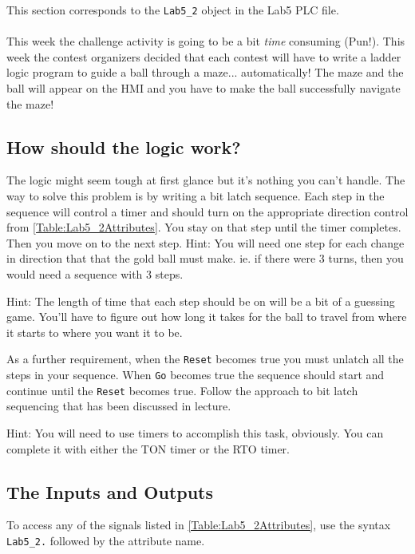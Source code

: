 This section corresponds to the \verb|Lab5_2| object in the Lab5 PLC file.
\\ 
\\

This week the challenge activity is going to be a bit \textit{time} consuming (Pun!). This week the contest organizers decided that each contest will have to write a ladder logic program to guide a ball through a maze... automatically! The maze and the ball will appear on the HMI and you have to make the ball successfully navigate the maze!

\subsection{How should the logic work?}

The logic might seem tough at first glance but it's nothing you can't handle. The way to solve this problem is by writing a bit latch sequence. Each step in the sequence will control a timer and should turn on the appropriate direction control from \tableautorefname \ref{Table:Lab5_2Attributes}. You stay on that step until the timer completes. Then you move on to the next step. 
Hint: You will need one step for each change in direction that that the gold ball must make. ie. if there were 3 turns, then you would need a sequence with 3 steps. 

Hint: The length of time that each step should be on will be a bit of a guessing game. You'll have to figure out how long it takes for the ball to travel from where it starts to where you want it to be.

As a further requirement, when the \verb|Reset| becomes true you must unlatch all the steps in your sequence. When \verb|Go| becomes true the sequence should start and continue until the \verb|Reset| becomes true. Follow the approach to bit latch sequencing that has been discussed in lecture.

Hint: You will need to use timers to accomplish this task, obviously. You can complete it with either the TON timer or the RTO timer. 

\subsection{The Inputs and Outputs}

To access any of the signals listed in \tableautorefname \ref{Table:Lab5_2Attributes}, use the syntax \verb|Lab5_2.| followed by the attribute name. 

